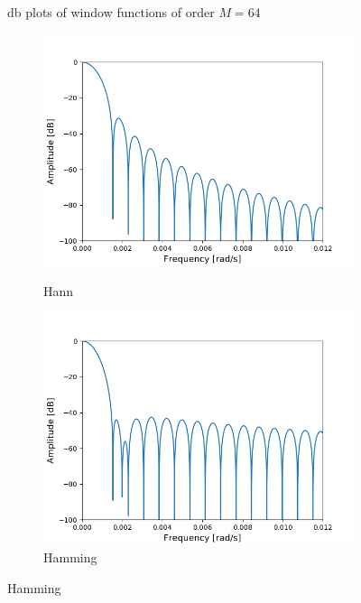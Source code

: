 \begin{figure}[H]
\caption{db plots of window functions of order $M=64$}
\label{fig:db_plots_64}
\end{figure}



\begin{figure}[H]
\centering

\begin{subfigure}{0.49\textwidth}
\centering
\includegraphics[width=\textwidth]{figures/dbplots/stft_bilag/8192/hann.png}
\caption{Hann}
\centering
\includegraphics[width=\textwidth]{figures/dbplots/stft_bilag/8192/hamming.png}
\caption{Hamming}
\centering

\end{subfigure}
\end{figure}
